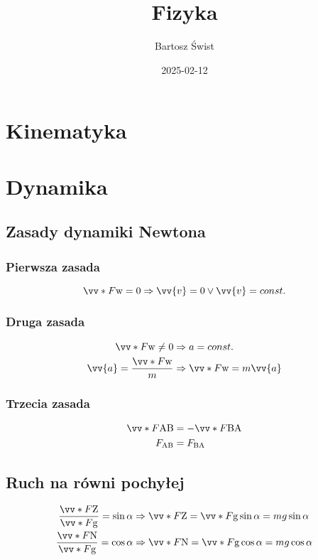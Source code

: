 \documentclass{article}
\title{Fizyka}
\date{2025-02-12}
\author{Bartosz Świst}
\newcommand{\F}[1]{\vv*{F}{\mathrm{#1}}}
\begin{document}
  \maketitle
  \newpage

  \section{Kinematyka}

  \newpage
  \section{Dynamika}
    \subsection{Zasady dynamiki Newtona}
      \subsubsection{Pierwsza zasada}
        \begin{equation*}
          \F{w} = 0 \Rightarrow \vv{v} = 0 \lor \vv{v} = const.
        \end{equation*}
      \subsubsection{Druga zasada}
        \begin{align*}
          \F{w} \neq 0 &\Rightarrow a = const.\\
          \vv{a} = \frac{\F{w}}{m} &\Rightarrow \F{w} = m\vv{a}
        \end{align*}
      \subsubsection{Trzecia zasada}
        \begin{align*}
          \F{AB} &= -\F{BA}\\
          F_{\mathrm{AB}} &= F_{\mathrm{BA}}
        \end{align*}
    \subsection{Ruch na równi pochyłej}
      \begin{align*}
        \frac{\F{Z}}{\F{g}} = \sin\alpha &\Rightarrow \F{Z} = \F{g}\sin\alpha = mg\sin\alpha\\
        \frac{\F{N}}{\F{g}} = \cos\alpha &\Rightarrow \F{N} = \F{g}\cos\alpha = mg\cos\alpha
      \end{align*}
\end{document}
